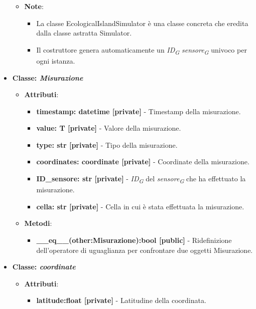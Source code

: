 \begin{itemize}
\begin{itemize}
\begin{itemize}
    \end{itemize}
    \item    \textbf{Note}:
    \begin{itemize}
        \item La classe EcologicalIslandSimulator è una classe concreta che eredita dalla classe astratta Simulator.
        \item Il costruttore genera automaticamente un \textit{ID}\textsubscript{\textit{G}} \textit{sensore}\textsubscript{\textit{G}} univoco per ogni istanza.
    \end{itemize}
\end{itemize}
    \item{\textbf{Classe: \textit{Misurazione}}}
    \begin{itemize}
        \item   \textbf{Attributi}: 
    \begin{itemize}
        \item \textbf{timestamp: datetime [private]} - Timestamp della misurazione.
        \item \textbf{value: T [private]} - Valore della misurazione.
        \item \textbf{type: str [private]} - Tipo della misurazione.
        \item \textbf{coordinates: coordinate [private]} - Coordinate della misurazione.
        \item \textbf{ID\_sensore: str [private]} - \textit{ID}\textsubscript{\textit{G}} del \textit{sensore}\textsubscript{\textit{G}} che ha effettuato la misurazione.
        \item \textbf{cella: str [private]} - Cella in cui è stata effettuata la misurazione.
    \end{itemize}
    \item   \textbf{Metodi}: 
    \begin{itemize}
        \item \textbf{\_\_eq\_\_(other:Misurazione):bool [public]} - Ridefinizione dell'operatore di uguaglianza per confrontare due oggetti Misurazione.
    \end{itemize}
\end{itemize}
    \item{\textbf{Classe: \textit{coordinate}}}
    \begin{itemize}
        \item    \textbf{Attributi}: 
    \begin{itemize}
        \item \textbf{latitude:float [private]} - Latitudine della coordinata.

\end{itemize}
\end{itemize}
\end{itemize}
